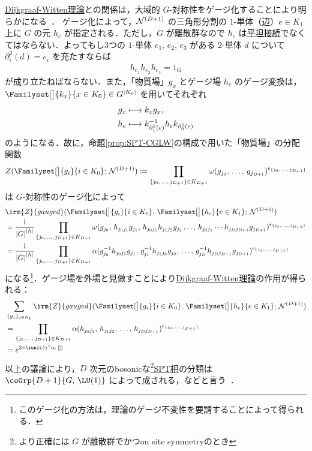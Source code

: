 \documentclass[TQFT_main]{subfiles}
\begin{document}
\hyperref[def:DijkgraafWitten]{Dijkgraaf-Witten理論}との関係は，大域的 $G$-対称性をゲージ化することにより明らかになる~\cite[APPENDIX E]{Wen2014SPT}．
ゲージ化によって，$\mathcal{N}^{(D+1)}$ の三角形分割の $1$-単体（辺）$e \in K_1$ 上に $G$ の元 $h_e$ が指定される．ただし，$G$ が離散群なので $h_{e}$ は\hyperref[def:flat-connection-homotopy]{平坦接続}でなくてはならない．よってもし3つの $1$-単体 $e_1,\, e_2,\, e_3$ がある $2$-単体 $d$ について $\partial_i^2 (d) = e_i$ を充たすならば
\begin{align}
    h_{e_1} h_{e_2} h_{e_3} = 1_G
\end{align}
が成り立たねばならない．また，「物質場」$g_{x}$ とゲージ場 $h_{e}$ のゲージ変換は，$\Familyset[\big]{k_x}{x \in K_0} \in G^{\abs{K_0}}$ を用いてそれぞれ
\begin{align}
    g_x &\longmapsto k_x g_x, \\
    h_e &\longmapsto k_{\partial_1^1(e)}^{-1} h_e k_{\partial_0^1(e)}
\end{align}
のようになる．故に，命題\ref{prop:SPT-CGLW}の構成で用いた「物質場」の分配関数
\begin{align}
    Z(\Familyset[\big]{g_{i}}{i \in K_0};\, \mfdcal{N}{D+1}) \coloneqq \prod_{\{j_0,\, \dots,\, j_{D+1}\} \in K_{D+1}} \omega (g_{j_0},\, \dots,\, g_{j_{D+1}})^{\epsilon_{\{j_0,\, \dots,\, j_{D+1}\}}}
\end{align}
は $G$-対称性のゲージ化によって
\begin{align}
    &\irm{Z}{gauged}(\Familyset[\big]{g_{i}}{i \in K_0},\, \Familyset[\big]{h_{e}}{e \in K_1};\,\mfdcal{N}{D+1}) \\   
    &= \frac{1}{\abs{G}^{\abs{\Lambda}}} \prod_{\{j_0,\, \dots,\, j_{D+1}\} \in K_{D+1}} \omega (g_{j_0},\, h_{j_0j_1} g_{j_1},\, h_{j_0j_1}h_{j_1j_2} g_{j_2} \dots,\, h_{j_0j_1} \cdots h_{j_D j_{D+1}}g_{j_{D+1}})^{\epsilon_{\{j_0,\, \dots,\, j_{D+1}\}}} \\
    &= \frac{1}{\abs{G}^{\abs{\Lambda}}} \prod_{\{j_0,\, \dots,\, j_{D+1}\} \in K_{D+1}} \alpha (g_{j_0}^{-1}h_{j_0j_1} g_{j_1},\, g_{j_1}^{-1} h_{j_1j_2} g_{j_2},\, \dots,\,g_{j_D}^{-1} h_{j_D j_{D+1}}g_{j_{D+1}})^{\epsilon_{\{j_0,\, \dots,\, j_{D+1}\}}}
\end{align}
になる\footnote{このゲージ化の方法は，理論のゲージ不変性を要請することによって得られる．}．ゲージ場を外場と見做すことにより\hyperref[def:DijkgraafWitten]{Dijkgraaf-Witten理論}の作用が得られる：
\begin{align}
    &\sum_{\{g_{j}\}_{j \in K_1}} \irm{Z}{gauged}(\Familyset[\big]{g_{i}}{i \in K_0},\, \Familyset[\big]{h_{e}}{e \in K_1};\,\mfdcal{N}{D+1}) \\
    &= \prod_{\{j_0,\, \dots,\, j_{D+1}\} \in K_{D+1}} \alpha (h_{j_0j_1},\, h_{j_1j_2},\, \dots,\, h_{j_D j_{D+1}})^{\epsilon_{\{j_0,\, \dots,\, j_{D+1}\}}} \\
    &= e^{2\pi \iunit \expval{\gamma^* \alpha,\, []}}
\end{align}
以上の議論により，$D$ 次元のbosonicな\footnote{より正確には $G$ が離散群でかつon site symmetryのとき}\hyperref[def:SPT-traditional]{SPT相}の分類は $\coGrp{D+1}{G,\, \LU(1)}$ によって成される，などと言う~\cite{ChenGuLiuWen2013}．
\end{document}
